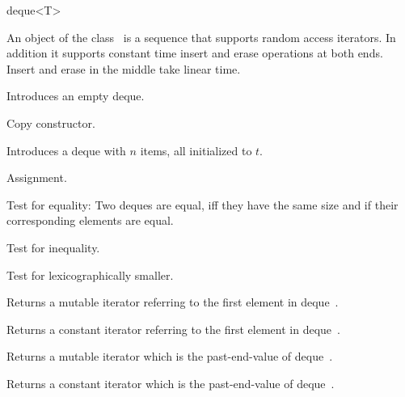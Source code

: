 
\ccHtmlNoClassLinks
\begin{ccClassTemplate} {deque<T>}


\ccDefinition
An object of the class \ccClassName\ is a sequence that supports
random access iterators. In addition it supports 
constant time insert and erase operations at both ends.  Insert and erase 
in the middle take linear time.

\ccHtmlLinksOff
{}
\ccHtmlLinksOn

\ccTypes
{}


\ccCreation
{}

             {Introduces an empty deque.}

 	    {Copy constructor.}

            {Introduces a deque with $n$ items, all initialized to $t$.}

\ccOperations
\ccSetTwoOfThreeColumns{3.5cm}{3.1cm}

        {Assignment.}


       {Test for equality: Two deques are equal, iff they have the same size
        and if their corresponding elements are equal.}

       {Test for inequality.}

       {Test for lexicographically smaller.}


       {Returns a mutable iterator referring to the first element in
        deque~\ccVar.}

\renewcommand{\ccTagRmTrailingConst}{\ccFalse}
       {Returns a constant iterator referring to the first element in
        deque~\ccVar.}
\renewcommand{\ccTagRmTrailingConst}{\ccTrue}


       {Returns a mutable iterator which is the past-end-value of
        deque~\ccVar.}

\renewcommand{\ccTagRmTrailingConst}{\ccFalse}
       {Returns a constant iterator which is the past-end-value of 
        deque~\ccVar.}
\renewcommand{\ccTagRmTrailingConst}{\ccTrue}



\end{ccClassTemplate}
